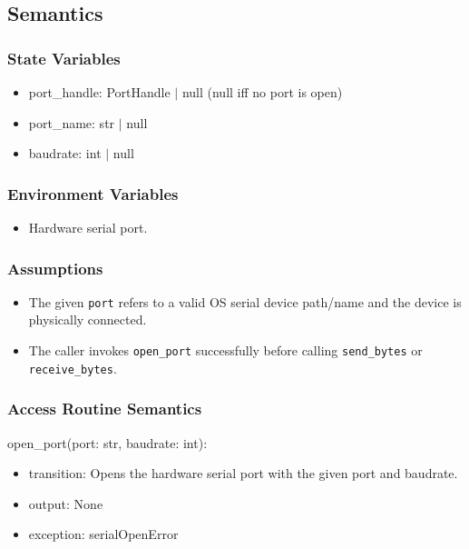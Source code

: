 \documentclass[12pt, titlepage]{article}
\begin{document}
\subsection{Semantics}
\subsubsection{State Variables}
\begin{itemize}
  \item port\_handle: PortHandle $|$ null (null iff no port is open)
  \item port\_name: str $|$ null
  \item baudrate: int $|$ null
\end{itemize}

\subsubsection{Environment Variables}

\begin{itemize}
  \item Hardware serial port.
\end{itemize}

\subsubsection{Assumptions}
\begin{itemize}
  \item The given \texttt{port} refers to a valid OS serial device path/name and the
        device is physically connected.
  \item The caller invokes \texttt{open\_port} successfully before calling
        \texttt{send\_bytes} or \texttt{receive\_bytes}.
\end{itemize}

\subsubsection{Access Routine Semantics}

\noindent open\_port(port: str, baudrate: int):
\begin{itemize}
  \item transition: Opens the hardware serial port with the given port and baudrate.
  \item output: None
  \item exception: serialOpenError
\end{itemize}
\end{document}
